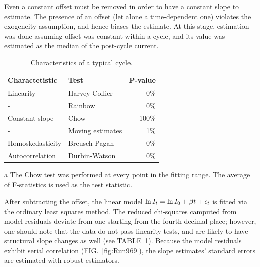 \documentclass[reprint]{revtex4-1}
\begin{document}
Even a constant offset must be removed in order to have a constant slope to estimate. The presence of an offset (let alone a time-dependent one) violates the exogeneity assumption, and hence biases the estimate. At this stage, estimation was done assuming offset was constant within a cycle, and its value was estimated as the median of the post-cycle current.

\begin{table}
\centering
\begin{threeparttable}
	\caption{Characteristics of a typical cycle.\label{tbl:CycleChars}}
	\begin{tabular}{llr}
	\hline\hline
	Charactetistic	& Test 					& P-value\\
	\hline
	Linearity 		& Harvey-Collier		& 0\% \\
	-				& Rainbow				& 0\% \\
	Constant slope	& Chow\tnote{a}		 	& 100\% \\
	-				& Moving estimates		& 1\% \\
	Homoskedasticity& Breusch-Pagan 		& 0\% \\
	Autocorrelation & Durbin-Watson			& 0\% \\
	\hline\hline
	\end{tabular}
	\begin{tablenotes}
		\item[a]{The Chow test was performed at every point in the fitting range. The average of F-statistics is used as the test statistic.}
	\end{tablenotes}
\end{threeparttable}
\end{table}

After subtracting the offset, the linear model $\ln I_t = \ln I_0 + \slp t +\epsilon_t$ is fitted via the ordinary least squares method. The reduced chi-squares camputed from model residuals deviate from one starting from the fourth decimal place; however, one should note that the data do not pass linearity tests, and are likely to have structural slope changes as well (see TABLE~\ref{tbl:CycleChars}). Because the model residuals exhibit serial correlation (FIG.~\ref{fig:Run969}), the slope estimates' standard errors are estimated with robust estimators.
\end{document}
